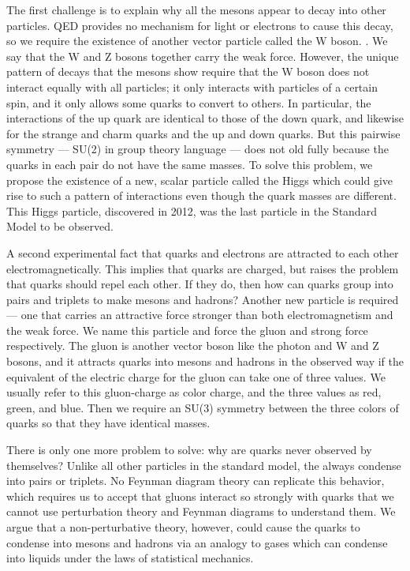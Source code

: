 The first challenge is to explain why all the mesons appear to decay into other particles. QED provides no mechanism for light or electrons to cause this decay, so we require the existence of another vector particle called the W boson. . We say that the W and Z bosons together carry the weak force. However, the unique pattern of decays that the mesons show require that the W boson does not interact equally with all particles; it only interacts with particles of a certain spin, and it only allows some quarks to convert to others. In particular, the interactions of the up quark are identical to those of the down quark, and likewise for the strange and charm quarks and the up and down quarks. But this pairwise symmetry --- SU(2) in group theory language --- does not old fully because the quarks in each pair do not have the same masses. To solve this problem, we propose the existence of a new, scalar particle called the Higgs which could give rise to such a pattern of interactions even though the quark masses are different. This Higgs particle, discovered in 2012, was the last particle in the Standard Model to be observed.

A second experimental fact that quarks and electrons are attracted to each other electromagnetically. This implies that quarks are charged, but raises the problem that quarks should repel each other. If they do, then how can quarks group into pairs and triplets to make mesons and hadrons? Another new particle is required --- one that carries an attractive force stronger than both electromagnetism and the weak force. We name this particle and force the gluon and strong force respectively. The gluon is another vector boson like the photon and W and Z bosons, and it attracts quarks into mesons and hadrons in the observed way if the equivalent of the electric charge for the gluon can take one of three values. We usually refer to this gluon-charge as color charge, and the three values as red, green, and blue. Then we require an SU(3) symmetry between the three colors of quarks so that they have identical masses.

There is only one more problem to solve: why are quarks never observed by themselves? Unlike all other particles in the standard  model, the always condense into pairs or triplets. No Feynman diagram theory can replicate this behavior, which requires us to accept that gluons interact so strongly with quarks that we cannot use perturbation theory and Feynman diagrams to understand them. We argue that a non-perturbative theory, however, could cause the quarks to condense into mesons and hadrons via an analogy to gases which can condense into liquids under the laws of statistical mechanics.

